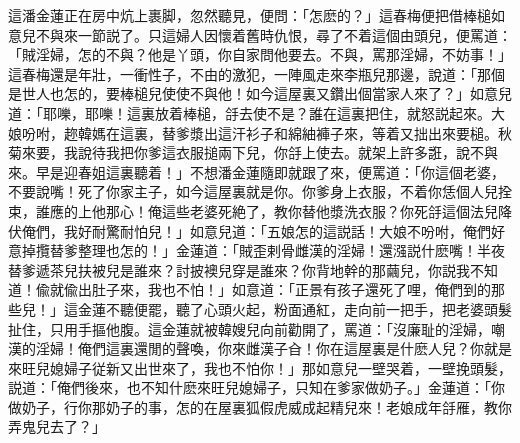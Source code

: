 這潘金蓮正在房中炕上裹脚，忽然聽見，便問：「怎麽的？」這春梅便把借棒槌如意兒不與來一節説了。只這婦人因懷着舊時仇恨，尋了不着這個由頭兒，便罵道：「賊淫婦，怎的不與？他是丫頭，你自家問他要去。不與，罵那淫婦，不妨事！」這春梅還是年壯，一衝性子，不由的激犯，一陣風走來李瓶兒那邊，說道：「那個是世人也怎的，要棒槌兒使使不與他！如今這屋裏又鑽出個當家人來了？」如意兒道：「耶嚛，耶嚛！這裏放着棒槌，㧱去使不是？誰在這裏把住，就怒説起來。大娘吩咐，趂韓媽在這裏，替爹漿出這汗衫子和綿紬褲子來，等着又拙出來要槌。秋菊來要，我說待我把你爹這衣服搥兩下兒，你㧱上使去。就架上許多誑，說不與來。早是迎春姐這裏聽着！」不想潘金蓮隨即就跟了來，便罵道：「你這個老婆，不要說嘴！死了你家主子，如今這屋裏就是你。你爹身上衣服，不着你恁個人兒拴束，誰應的上他那心！俺這些老婆死絶了，教你替他漿洗衣服？你死㧱這個法兒降伏俺們，我好耐驚耐怕兒！」如意兒道：「五娘怎的這説話！大娘不吩咐，俺們好意掉攬替爹整理也怎的！」金蓮道：「賊歪剌骨雌漢的淫婦！還漒説什麽嘴！半夜替爹遞茶兒扶被兒是誰來？討披襖兒穿是誰來？你背地幹的那繭兒，你説我不知道！偸就偸出肚子來，我也不怕！」如意道：「正景有孩子還死了哩，俺們到的那些兒！」這金蓮不聽便罷，聽了心頭火起，粉面通紅，走向前一把手，把老婆頭髮扯住，只用手摳他腹。這金蓮就被韓嫂兒向前勸開了，罵道：「沒廉耻的淫婦，嘲漢的淫婦！俺們這裏還閒的聲喚，你來雌漢子㒲！你在這屋裏是什麽人兒？你就是來旺兒媳婦子従新又出世來了，我也不怕你！」那如意兒一壁哭着，一壁挽頭髮，説道：「俺們後來，也不知什麽來旺兒媳婦子，只知在爹家做奶子。」金蓮道：「你做奶子，行你那奶子的事，怎的在屋裏狐假虎威成起精兒來！老娘成年㧱雁，教你弄鬼兒去了？」

